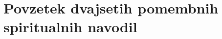 \section{Povzetek dvajsetih pomembnih spiritualnih navodil}
\label{sec:povzetek_dvajsetih_pomembnih_spiritualnih_navodil}


